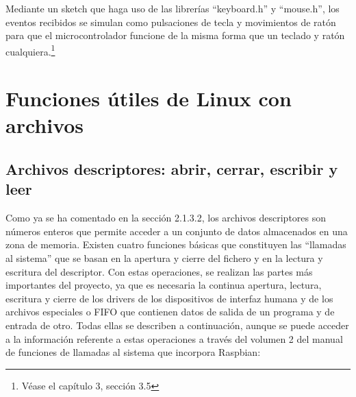 Mediante un sketch que haga uso de las librerías ``keyboard.h'' y ``mouse.h'', los eventos recibidos se simulan como pulsaciones de tecla y movimientos de ratón para que el microcontrolador funcione de la misma forma que un teclado y ratón cualquiera.\footnote{Véase el capítulo 3, sección 3.5}











\section{Funciones útiles de Linux con archivos} \label{s2_7}

\subsection{Archivos descriptores: abrir, cerrar, escribir y leer} \label{s2_7_1}

Como ya se ha comentado en la sección 2.1.3.2, los archivos descriptores son números enteros que permite acceder a un conjunto de datos almacenados en una zona de memoria. Existen cuatro funciones básicas que constituyen las ``llamadas al sistema'' que se basan en la apertura y cierre del fichero y en la lectura y escritura del descriptor. Con estas operaciones, se realizan las partes más importantes del proyecto, ya que es necesaria la continua apertura, lectura, escritura y cierre de los drivers de los dispositivos de interfaz humana y de los archivos especiales o FIFO que contienen datos de salida de un programa y de entrada de otro. Todas ellas se describen a continuación, aunque se puede acceder a la información referente a estas operaciones a través del volumen 2 del manual de funciones de llamadas al sistema que incorpora Raspbian:

